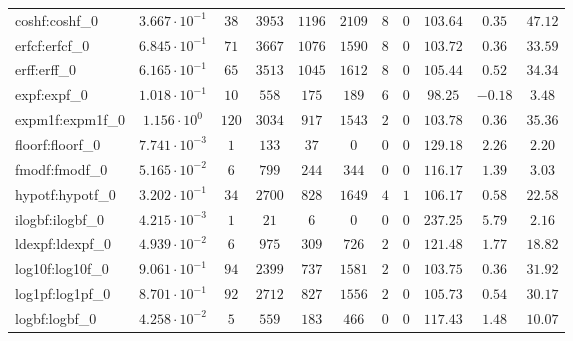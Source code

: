 \begin{tabular}{|l|c|c|c|c|c|c|c|c|c|c|}
coshf:coshf\_0               & $ 3.667 \cdot 10^{-1} $ & $ 38     $ & $ 3953  $ & $ 1196  $ & $ 2109  $ & $ 8   $ & $ 0 $ & $ 103.64      $ & $ 0.35    $ & $ 47.12   $ \\
erfcf:erfcf\_0               & $ 6.845 \cdot 10^{-1} $ & $ 71     $ & $ 3667  $ & $ 1076  $ & $ 1590  $ & $ 8   $ & $ 0 $ & $ 103.72      $ & $ 0.36    $ & $ 33.59   $ \\
erff:erff\_0                 & $ 6.165 \cdot 10^{-1} $ & $ 65     $ & $ 3513  $ & $ 1045  $ & $ 1612  $ & $ 8   $ & $ 0 $ & $ 105.44      $ & $ 0.52    $ & $ 34.34   $ \\
expf:expf\_0                 & $ 1.018 \cdot 10^{-1} $ & $ 10     $ & $ 558   $ & $ 175   $ & $ 189   $ & $ 6   $ & $ 0 $ & $ 98.25       $ & $ -0.18   $ & $ 3.48    $ \\
expm1f:expm1f\_0             & $ 1.156 \cdot 10^{0}  $ & $ 120    $ & $ 3034  $ & $ 917   $ & $ 1543  $ & $ 2   $ & $ 0 $ & $ 103.78      $ & $ 0.36    $ & $ 35.36   $ \\
floorf:floorf\_0             & $ 7.741 \cdot 10^{-3} $ & $ 1      $ & $ 133   $ & $ 37    $ & $ 0     $ & $ 0   $ & $ 0 $ & $ 129.18      $ & $ 2.26    $ & $ 2.20    $ \\
fmodf:fmodf\_0               & $ 5.165 \cdot 10^{-2} $ & $ 6      $ & $ 799   $ & $ 244   $ & $ 344   $ & $ 0   $ & $ 0 $ & $ 116.17      $ & $ 1.39    $ & $ 3.03    $ \\
hypotf:hypotf\_0             & $ 3.202 \cdot 10^{-1} $ & $ 34     $ & $ 2700  $ & $ 828   $ & $ 1649  $ & $ 4   $ & $ 1 $ & $ 106.17      $ & $ 0.58    $ & $ 22.58   $ \\
ilogbf:ilogbf\_0             & $ 4.215 \cdot 10^{-3} $ & $ 1      $ & $ 21    $ & $ 6     $ & $ 0     $ & $ 0   $ & $ 0 $ & $ 237.25      $ & $ 5.79    $ & $ 2.16    $ \\
ldexpf:ldexpf\_0             & $ 4.939 \cdot 10^{-2} $ & $ 6      $ & $ 975   $ & $ 309   $ & $ 726   $ & $ 2   $ & $ 0 $ & $ 121.48      $ & $ 1.77    $ & $ 18.82   $ \\
log10f:log10f\_0             & $ 9.061 \cdot 10^{-1} $ & $ 94     $ & $ 2399  $ & $ 737   $ & $ 1581  $ & $ 2   $ & $ 0 $ & $ 103.75      $ & $ 0.36    $ & $ 31.92   $ \\
log1pf:log1pf\_0             & $ 8.701 \cdot 10^{-1} $ & $ 92     $ & $ 2712  $ & $ 827   $ & $ 1556  $ & $ 2   $ & $ 0 $ & $ 105.73      $ & $ 0.54    $ & $ 30.17   $ \\
logbf:logbf\_0               & $ 4.258 \cdot 10^{-2} $ & $ 5      $ & $ 559   $ & $ 183   $ & $ 466   $ & $ 0   $ & $ 0 $ & $ 117.43      $ & $ 1.48    $ & $ 10.07   $ \\

\end{tabular}
